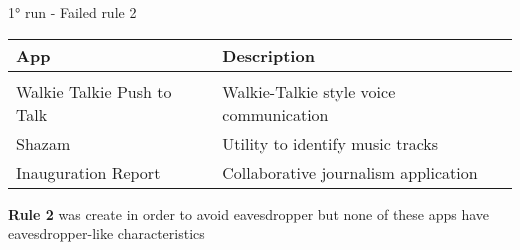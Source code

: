 \begin{frame}{\ang{1} run - Failed rule 2}

\fontsize{10pt}{0}\selectfont
\begin{table}[]
\centering
\begin{tabular}{ll}
\textbf{App}              & \textbf{Description}                    \\[5pt] 
\hline\\[5pt]
Walkie Talkie Push to Talk & Walkie-Talkie style voice communication \\[5pt]
Shazam                    & Utility to identify music tracks        \\[5pt]
Inauguration Report       & Collaborative journalism application    \\[5pt]
\hline
\end{tabular}
\end{table}
\fontsize{15pt}{0}\selectfont

\vfill

\textbf{Rule 2} was create in order to avoid eavesdropper but none of these apps
have eavesdropper-like characteristics

\end{frame}